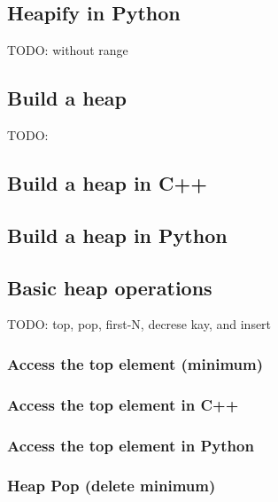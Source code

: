 \documentclass{article}
\begin{document}
\subsection*{Heapify in Python}

TODO: without range

\subsection{Build a heap}

TODO:

\subsection*{Build a heap in C++}

\subsection*{Build a heap in Python}

\subsection{Basic heap operations}

TODO: top, pop, first-N, decrese kay, and insert

\subsubsection{Access the top element (minimum)}

\subsubsection*{Access the top element in C++}

\subsubsection*{Access the top element in Python}

\subsubsection{Heap Pop (delete minimum)}
\end{document}
